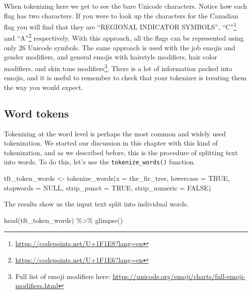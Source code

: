 \documentclass[
]{krantz}
\makeatletter
\newenvironment{Shaded}{\begin{snugshade}}{\end{snugshade}}
\newcommand{\AttributeTok}[1]{\textcolor[rgb]{0.77,0.63,0.00}{#1}}
\newcommand{\ConstantTok}[1]{\textcolor[rgb]{0.00,0.00,0.00}{#1}}
\newcommand{\FunctionTok}[1]{\textcolor[rgb]{0.00,0.00,0.00}{#1}}
\newcommand{\NormalTok}[1]{#1}
\newcommand{\OtherTok}[1]{\textcolor[rgb]{0.56,0.35,0.01}{#1}}
\newcommand{\SpecialCharTok}[1]{\textcolor[rgb]{0.00,0.00,0.00}{#1}}
\DeclareRobustCommand{\href}[2]{#2\footnote{\url{#1}}}
\renewcommand{\href}[2]{#2\footnote{\url{#1}}}
\newenvironment{kframe}{%
\medskip{}
\setlength{\fboxsep}{.8em}
 \def\at@end@of@kframe{}%
 \ifinner\ifhmode%
  \def\at@end@of@kframe{\end{minipage}}%
  \begin{minipage}{\columnwidth}%
 \fi\fi%
 \def\FrameCommand##1{\hskip\@totalleftmargin \hskip-\fboxsep
 \colorbox{shadecolor}{##1}\hskip-\fboxsep
     \hskip-\linewidth \hskip-\@totalleftmargin \hskip\columnwidth}%
 \MakeFramed {\advance\hsize-\width
   \@totalleftmargin\z@ \linewidth\hsize
   \@setminipage}}%
 {\par\unskip\endMakeFramed%
 \at@end@of@kframe}
\renewenvironment{Shaded}{\begin{kframe}}{\end{kframe}}
\makeatother
\begin{document}
When tokenizing here we get to see the bare Unicode characters. Notice how each flag has two characters. If you were to look up the characters for the Canadian flag you will find that they are ``REGIONAL INDICATOR SYMBOLS'', \href{https://codepoints.net/U+1F1E8?lang=en}{``C''} and \href{https://codepoints.net/U+1F1E6?lang=en}{``A''} respectively. With this approach, all the flags can be represented using only 26 Unicode symbols. The same approach is used with the job emojis and gender modifiers, and general emojis with hairstyle modifiers, hair color modifiers, and skin tone modifiers\footnote{Full list of emoji modifiers here: \url{https://unicode.org/emoji/charts/full-emoji-modifiers.html}}. There is a lot of information packed into emojis, and it is useful to remember to check that your tokenizer is treating them the way you would expect.

\hypertarget{word-tokens}{%
\subsection{Word tokens}\label{word-tokens}}

Tokenizing at the word level is perhaps the most common and widely used tokenization. We started our discussion in this chapter with this kind of tokenization, and as we described before, this is the procedure of splitting text into words. To do this, let's use the \texttt{tokenize\_words()} function.

\begin{Shaded}
\begin{Highlighting}[]
\NormalTok{tft\_token\_words }\OtherTok{\textless{}{-}} \FunctionTok{tokenize\_words}\NormalTok{(}\AttributeTok{x =}\NormalTok{ the\_fir\_tree,}
                                  \AttributeTok{lowercase =} \ConstantTok{TRUE}\NormalTok{,}
                                  \AttributeTok{stopwords =} \ConstantTok{NULL}\NormalTok{,}
                                  \AttributeTok{strip\_punct =} \ConstantTok{TRUE}\NormalTok{,}
                                  \AttributeTok{strip\_numeric =} \ConstantTok{FALSE}\NormalTok{)}
\end{Highlighting}
\end{Shaded}

The results show us the input text split into individual words.

\begin{Shaded}
\begin{Highlighting}[]
\FunctionTok{head}\NormalTok{(tft\_token\_words) }\SpecialCharTok{\%\textgreater{}\%}
  \FunctionTok{glimpse}\NormalTok{()}
\end{Highlighting}
\end{Shaded}
\end{document}
